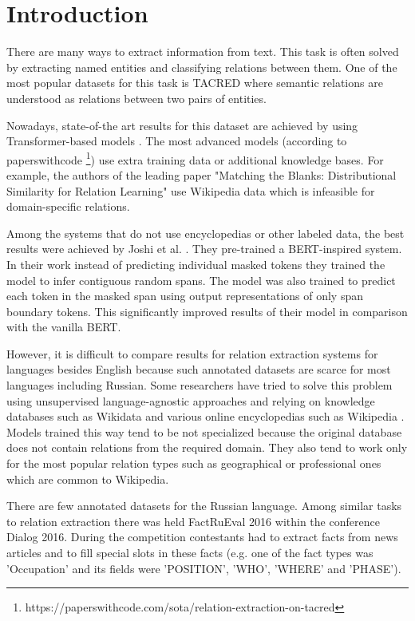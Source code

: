 \documentclass{dialogue}
\begin{document}

\section{Introduction}
There are many ways to extract information from text. This task is often solved by extracting named entities and classifying relations between them. One of the most popular datasets for this task is TACRED \cite{tacred} where semantic relations are understood as relations between two pairs of entities.

Nowadays, state-of-the art results for this dataset are achieved by using Transformer-based models \cite{attention}. The most advanced models (according to paperswithcode \footnote{https://paperswithcode.com/sota/relation-extraction-on-tacred}) use extra training data or additional knowledge bases. For example, the authors of the leading paper "Matching the Blanks: Distributional Similarity for Relation Learning" \cite{BaldiniSoares2019} use Wikipedia data which is infeasible for domain-specific relations.

Among the systems that do not use encyclopedias or other labeled data, the best results were achieved by Joshi et al. \cite{spanbert}. They pre-trained a BERT-inspired system. In their work instead of predicting individual masked tokens they trained the model to infer contiguous random  spans. The model was also trained to predict each token in the masked span using output representations of only span boundary tokens. This significantly improved results of their model in comparison with the vanilla BERT.

However, it is difficult to compare results for relation extraction systems for languages besides English because such annotated datasets are scarce for most languages including Russian. Some researchers have tried to solve this problem using unsupervised language-agnostic approaches and relying on knowledge databases such as Wikidata and various online encyclopedias such as Wikipedia \cite{Heist2017}. Models trained this way tend to be not specialized because the original database does not contain relations from the required domain. They also tend to work only for the most popular relation types such as geographical or professional ones which are common to Wikipedia.

There are few annotated datasets for the Russian language. Among similar tasks to relation extraction there was held FactRuEval 2016 within the conference Dialog 2016. During the competition contestants had to extract facts from news articles and to fill special slots in these facts (e.g. one of the fact types was 'Occupation' and its fields were 'POSITION', 'WHO', 'WHERE' and 'PHASE').
\end{document}
